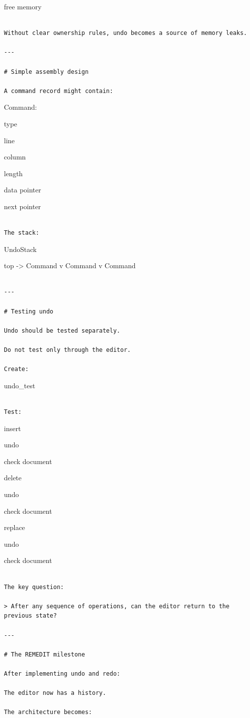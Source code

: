 \documentclass[
  oneside,
  openany]{book}
\begin{document}
free memory

\begin{verbatim}

Without clear ownership rules, undo becomes a source of memory leaks.

---

# Simple assembly design

A command record might contain:
\end{verbatim}

Command:

type

line

column

length

data pointer

next pointer

\begin{verbatim}

The stack:
\end{verbatim}

UndoStack

top -\textgreater{} Command \textbar{} v Command \textbar{} v Command

\begin{verbatim}

---

# Testing undo

Undo should be tested separately.

Do not test only through the editor.

Create:
\end{verbatim}

undo\_test

\begin{verbatim}

Test:
\end{verbatim}

insert

undo

check document

delete

undo

check document

replace

undo

check document

\begin{verbatim}

The key question:

> After any sequence of operations, can the editor return to the previous state?

---

# The REMEDIT milestone

After implementing undo and redo:

The editor now has a history.

The architecture becomes:
\end{verbatim}
\end{document}
